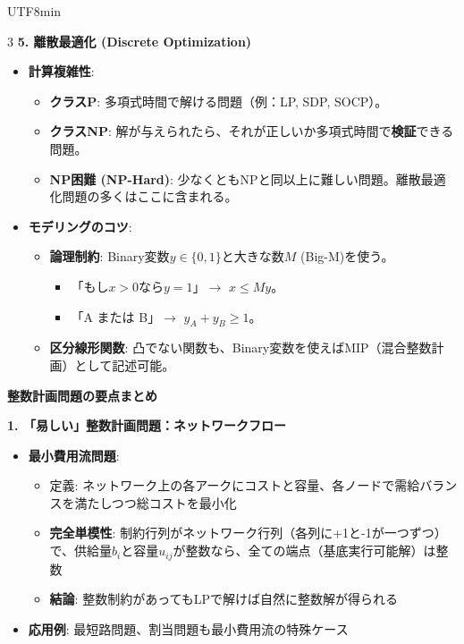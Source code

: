 \documentclass[8pt,a4paper]{article}
\newcommand{\mysection}[1]{\vspace{2pt}\textbf{#1}\vspace{1pt}}
\begin{document}
\begin{CJK}{UTF8}{min}
\begin{multicols}{3}
\textbf{5. 離散最適化 (Discrete Optimization)}
\begin{itemize}
    \item \textbf{計算複雑性}:
    \begin{itemize}
        \item \textbf{クラスP}: 多項式時間で解ける問題（例：LP, SDP, SOCP）。
        \item \textbf{クラスNP}: 解が与えられたら、それが正しいか多項式時間で\textbf{検証}できる問題。
        \item \textbf{NP困難 (NP-Hard)}: 少なくともNPと同以上に難しい問題。離散最適化問題の多くはここに含まれる。
    \end{itemize}
    \item \textbf{モデリングのコツ}:
    \begin{itemize}
        \item \textbf{論理制約}: Binary変数$y \in \{0,1\}$と大きな数$M$ (Big-M)を使う。
        \begin{itemize}
            \item 「もし$x > 0$なら$y=1$」$\rightarrow$ $x \leq M y$。
            \item 「A または B」$\rightarrow$ $y_A + y_B \geq 1$。
        \end{itemize}
        \item \textbf{区分線形関数}: 凸でない関数も、Binary変数を使えばMIP（混合整数計画）として記述可能。
    \end{itemize}
\end{itemize}

\mysection{整数計画問題の要点まとめ}

\textbf{1. 「易しい」整数計画問題：ネットワークフロー}
\begin{itemize}
    \item \textbf{最小費用流問題}:
    \begin{itemize}
        \item 定義: ネットワーク上の各アークにコストと容量、各ノードで需給バランスを満たしつつ総コストを最小化
        \item \textbf{完全単模性}: 制約行列がネットワーク行列（各列に+1と-1が一つずつ）で、供給量$b_i$と容量$u_{ij}$が整数なら、全ての端点（基底実行可能解）は整数
        \item \textbf{結論}: 整数制約があってもLPで解けば自然に整数解が得られる
    \end{itemize}
    \item \textbf{応用例}: 最短路問題、割当問題も最小費用流の特殊ケース
\end{itemize}


\end{multicols}
\end{CJK}
\end{document}
